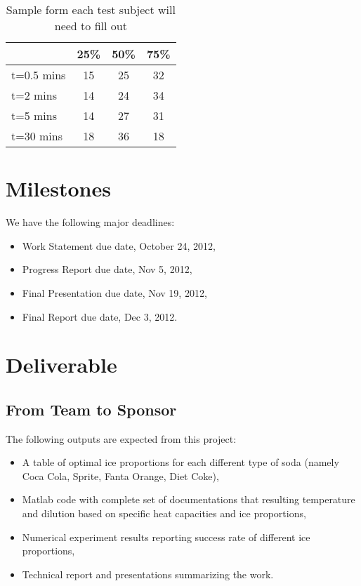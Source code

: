 \documentclass[12pt,letterpaper]{article}
\theoremstyle{definition}
\begin{document}
\begin{table}[ h]

\begin{tabular}{ l || c|c|c }
  &25\% &50\% & 75\%  \\
\hline  
t=0.5 mins & 15 & 25 & 32\\ 
\hline  
t=2 mins & 14 & 24 & 34\\ 
\hline  
t=5 mins & 14 & 27 & 31\\ 
\hline  
t=30 mins & 18 & 36 & 18\\ 
\hline  
   
 \end{tabular}

\caption{Sample form each test subject will need to fill out}

\end{table}

\section{Milestones}
We have the following major deadlines:
\begin{itemize}
    \item Work Statement due date, October 24, 2012,
    \item Progress Report due date, Nov 5, 2012,
    \item Final Presentation due date, Nov 19, 2012,
    \item Final Report due date, Dec 3, 2012.
\end{itemize}

\section{Deliverable}
\subsection{From Team to Sponsor} %
The following outputs are expected from this project:
\begin{itemize}
    \item A table of optimal ice proportions for each different type of soda (namely Coca Cola, Sprite, Fanta Orange, Diet Coke),
    \item Matlab code with complete set of documentations that resulting temperature and dilution based on specific heat capacities and ice proportions,
    \item Numerical experiment results reporting success rate of different ice proportions,
    \item Technical report and presentations summarizing the work. 
\end{itemize}
\end{document}
